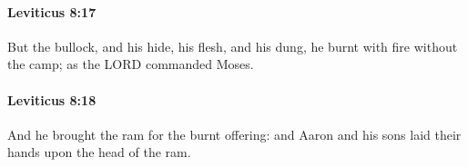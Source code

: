 		\paragraph{Leviticus 8:17} %
			\label{LEVITICUS-8-17}

			But the bullock, and his hide, his flesh, and his dung, he burnt with fire without the camp; as the LORD commanded Moses.


		\paragraph{Leviticus 8:18} %
			\label{LEVITICUS-8-18}

			And he brought the ram for the burnt offering: and Aaron and his sons laid their hands upon the head of the ram.


